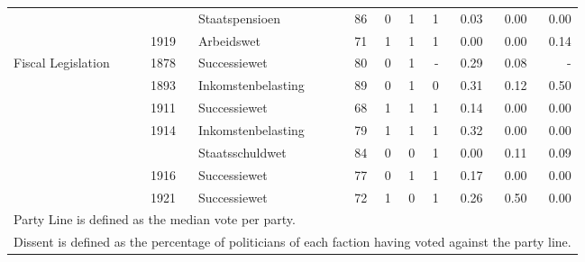 \begin{table}
\begin{tabular}[t]{lllrrrrrrr}
 &  & Staatspensioen & 86 & \num{0} & \num{1} & \num{1} & \num{0.03} & \num{0.00} & \num{0.00}\\
 & 1919 & Arbeidswet & 71 & \num{1} & \num{1} & \num{1} & \num{0.00} & \num{0.00} & \num{0.14}\\
Fiscal Legislation & 1878 & Successiewet & 80 & \num{0} & \num{1} & - & \num{0.29} & \num{0.08} & -\\
 & 1893 & Inkomstenbelasting & 89 & \num{0} & \num{1} & \num{0} & \num{0.31} & \num{0.12} & \num{0.50}\\
 & 1911 & Successiewet & 68 & \num{1} & \num{1} & \num{1} & \num{0.14} & \num{0.00} & \num{0.00}\\
 & 1914 & Inkomstenbelasting & 79 & \num{1} & \num{1} & \num{1} & \num{0.32} & \num{0.00} & \num{0.00}\\
 &  & Staatsschuldwet & 84 & \num{0} & \num{0} & \num{1} & \num{0.00} & \num{0.11} & \num{0.09}\\
 & 1916 & Successiewet & 77 & \num{0} & \num{1} & \num{1} & \num{0.17} & \num{0.00} & \num{0.00}\\
 & 1921 & Successiewet & 72 & \num{1} & \num{0} & \num{1} & \num{0.26} & \num{0.50} & \num{0.00}\\
\bottomrule
\multicolumn{10}{l}{\rule{0pt}{1em}Party Line is defined as the median vote per party.}\\
\multicolumn{10}{l}{\rule{0pt}{1em}Dissent is defined as the percentage of politicians of each faction having voted against the party line.}\\
\end{tabular}
\end{table}
